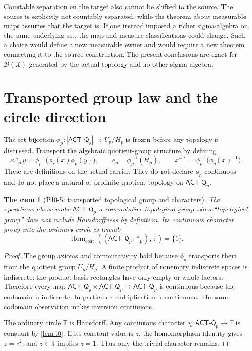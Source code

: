 \documentclass[11pt]{article}
\newtheorem{theorem}{Theorem}[section]
\theoremstyle{definition}
\newcommand{\Borel}{\mathcal B}
\newcommand{\T}{\mathbb T}
\newcommand{\ACTQ}{\mathsf{ACT\mbox{-}Q}_p}
\begin{document}
Countable separation on the target also cannot be shifted to the source.  The source is explicitly not countably separated, while the theorem about measurable maps assumes that the target is.  If one instead imposed a richer sigma-algebra on the same underlying set, the map and measure classifications could change.  Such a choice would define a new measurable owner and would require a new theorem connecting it to the source construction.  The present conclusions are exact for $\Borel(X)$ generated by the actual topology and no other sigma-algebra.

\section{Transported group law and the circle direction}
\label{sec:group}

The set bijection $\phi_p:|\ACTQ|\to U_p/H_p$ is frozen before any topology is discussed.  Transport the algebraic quotient-group structure by defining
\[
 x*_py=\phi_p^{-1}\!\bigl(\phi_p(x)\phi_p(y)\bigr),\qquad
 e_p=\phi_p^{-1}(H_p),\qquad
 x^{-*}=\phi_p^{-1}\!\bigl(\phi_p(x)^{-1}\bigr).
\]
These are definitions on the actual carrier.  They do not declare $\phi_p$ continuous and do not place a natural or profinite quotient topology on $\ACTQ$.

\begin{theorem}[P10-5: transported topological group and characters]
\label{thm:characters}
The operations above make $\ACTQ$ a commutative topological group when ``topological group'' does not include Hausdorffness by definition.  Its continuous character group into the ordinary circle is trivial:
\[
 \operatorname{Hom}_{\mathrm{cont}}((\ACTQ,*_p),\T)=\{1\}.
\]
\end{theorem}

\begin{proof}
The group axioms and commutativity hold because $\phi_p$ transports them from the quotient group $U_p/H_p$.  A finite product of nonempty indiscrete spaces is indiscrete: the product-basis rectangles have only empty or whole factors.  Therefore every map $\ACTQ\times\ACTQ\to\ACTQ$ is continuous because the codomain is indiscrete.  In particular multiplication is continuous.  The same codomain observation makes inversion continuous.

The ordinary circle $\T$ is Hausdorff.  Any continuous character $\chi:\ACTQ\to\T$ is constant by \cref{lem:t0}.  If its constant value is $z$, the homomorphism identity gives $z=z^2$, and $z\in\T$ implies $z=1$.  Thus only the trivial character remains.
\end{proof}
\end{document}
